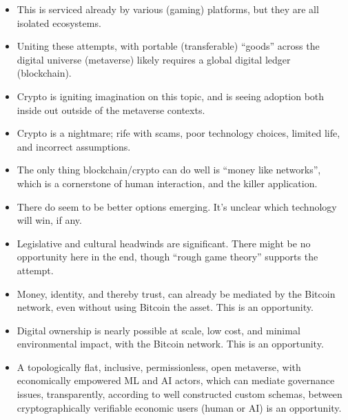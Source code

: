 {\begin{itemize}
\item This is serviced already by various (gaming) platforms, but they are all isolated ecosystems.
\item Uniting these attempts, with portable (transferable) ``goods'' across the digital universe (metaverse) likely requires a global digital ledger (blockchain).
\item Crypto is igniting imagination on this topic, and is seeing adoption both inside out outside of the metaverse contexts.
\item Crypto is a nightmare; rife with scams, poor technology choices, limited life, and incorrect assumptions.
\item The only thing blockchain/crypto can do well is ``money like networks'', which is a cornerstone of human interaction, and the killer application.
\item There do seem to be better options emerging. It's unclear which technology will win, if any.
\item Legislative and cultural headwinds are significant. There might be no opportunity here in the end, though ``rough game theory'' supports the attempt.
\item Money, identity, and thereby trust, can already be mediated by the Bitcoin network, even without using Bitcoin the asset. This is an opportunity.
\item Digital ownership is nearly possible at scale, low cost, and minimal environmental impact, with the Bitcoin network. This is an opportunity.
\item A topologically flat, inclusive, permissionless, open metaverse, with economically empowered ML and AI actors, which can mediate governance issues, transparently, according to well constructed custom schemas, between cryptographically verifiable economic users (human or AI) is an opportunity.
\end{itemize}
}
